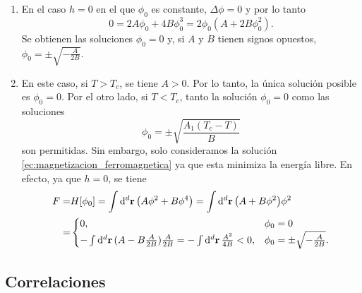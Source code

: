 \documentclass{article}
\begin{document}
\begin{enumerate}
\item En el caso $h=0$ en el que $\phi_0$ es constante, $\Delta\phi=0$ y por lo tanto
\begin{equation}
0=2A\phi_0+4B\phi_0^3=2\phi_0(A+2B\phi_0^2).
\end{equation}
Se obtienen las soluciones $\phi_0=0$ y, si $A$ y $B$ tienen signos opuestos, $\phi_0=\pm\sqrt{-\frac{A}{2B}}$.

\item En este caso, si $T>T_c$, se tiene $A>0$. Por lo tanto, la única solución posible es $\phi_0=0$. Por el otro lado, si $T<T_c$, tanto la solución $\phi_0=0$ como las soluciones 
\begin{equation}\label{ec:magnetizacion_ferromagnetica}
\phi_0=\pm\sqrt{\frac{A_1(T_c-T)}{B}}
\end{equation}
son permitidas. Sin embargo, solo consideramos la solución \eqref{ec:magnetizacion_ferromagnetica} ya que esta minimiza la energía libre. En efecto, ya que $h=0$, se tiene
\begin{align}
\begin{split}
F=&H[\phi_0]=\int\dd[d]{\vb{r}}\qty(A\phi^2+B\phi^4)=\int\dd[d]{\vb{r}}\qty(A+B\phi^2)\phi^2\\
=&\begin{cases}
0, & \phi_0=0\\
-\int\dd[d]{\vb{r}}(A-B\frac{A}{2B})\frac{A}{2B}=-\int\dd[d]{\vb{r}}\frac{A^2}{4B}<0, & \phi_0=\pm{\sqrt{-\frac{A}{2B}}}.
\end{cases}
\end{split}
\end{align} 

\end{enumerate}

\subsection{Correlaciones}
\end{document}
